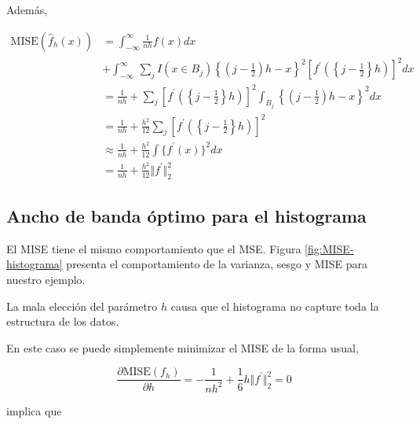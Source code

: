 \documentclass[12pt]{book}\usepackage[]{graphicx}\usepackage[]{color}
\theoremstyle{definition}
\theoremstyle{plain}
\begin{document}
Además,

\begin{align*}
	\mathrm{MISE} (\hat{f}_h(x))
	  & = \int_{ -\infty}^{\infty} \frac{1}{nh} f(x)dx                                                                                                                                          \\
	  & + \int_{ -\infty}^{\infty}\, \sum_{j}^{} I(x\in B_j) \left\{ \left( j- \frac{1}{2} \right)h -x  \right\}^2 \left [f^\prime \left( \left\{j - \frac{1}{2}\right\}h \right)  \right]^2 dx \\
	  & = \frac{1}{nh} + \sum_{j}^{} \left [f^\prime \left( \left\{j - \frac{1}{2}\right\}h \right)  \right]^2 \int_{ B_j}    \left\{ \left( j- \frac{1}{2} \right)h -x  \right\}^2 dx          \\
	  & =\frac{1}{nh} + \frac{h^2}{12} \sum_{j} \left [f^\prime \left( \left\{j - \frac{1}{2}\right\}h \right)  \right]^2                                                                       \\
	  & \approx \frac{1}{nh} + \frac{h^2}{12} \int \{f^\prime(x)\}^2 dx                                                                                                                         \\
	  & =\frac{1}{nh} + \frac{h^2}{12} \Vert f^\prime\Vert_{2}^2
\end{align*}

\subsection{Ancho de banda óptimo para el histograma}

El MISE tiene el mismo comportamiento que el MSE. Figura \ref{fig:MISE-histograma} presenta el comportamiento de la varianza, sesgo y MISE para nuestro ejemplo.



La mala elección del parámetro $h$ causa que el histograma no capture toda la estructura de los datos.



En este caso se puede simplemente minimizar el MISE de la forma usual,

\begin{equation*}
	\frac{\partial \mathrm{MISE}(f_{h})}{\partial h} = -\frac{1}{nh^2} + \frac{1}{6} h \Vert f^\prime\Vert_{2}^2 = 0
\end{equation*}

implica que
\end{document}
